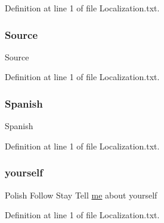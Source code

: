 Definition at line 1 of file Localization.\+txt.

\mbox{\label{_blooms_01_animal_01_husbandry_2_config_2_localization_8txt_a176e1eca2d1e3d1c6a064340bc6a351e}} 
\subsubsection{\texorpdfstring{Source}{Source}}
{\footnotesize\ttfamily Source}



Definition at line 1 of file Localization.\+txt.

\mbox{\label{_blooms_01_animal_01_husbandry_2_config_2_localization_8txt_a1a2fba2f516cad50ef94b146902a8336}} 
\subsubsection{\texorpdfstring{Spanish}{Spanish}}
{\footnotesize\ttfamily Spanish}



Definition at line 1 of file Localization.\+txt.

\mbox{\label{_blooms_01_animal_01_husbandry_2_config_2_localization_8txt_a919303dabda3da26b4f85a616c655c07}} 
\subsubsection{\texorpdfstring{yourself}{yourself}}
{\footnotesize\ttfamily Polish Follow Stay Tell \mbox{\hyperlink{_blooms_01_animal_01_husbandry_2_config_2_localization_8txt_a290fbecf7c016b09bc675718400d6fca}{me}} about yourself}



Definition at line 1 of file Localization.\+txt.

